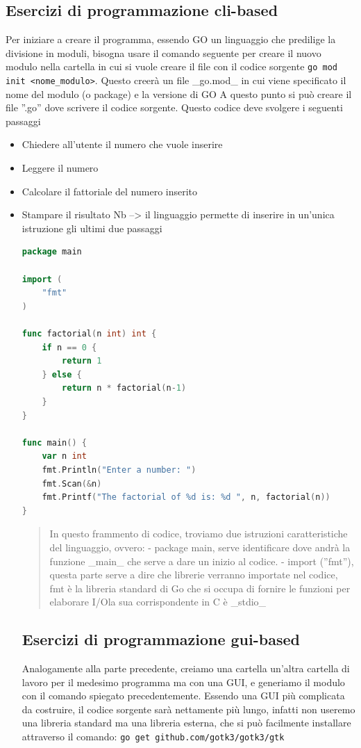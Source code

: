 \newpage

\subsection{Esercizi di programmazione cli-based}
Per iniziare a creare il programma, essendo GO un linguaggio che predilige la divisione in moduli, bisogna usare il comando seguente per creare il nuovo modulo nella cartella in cui si vuole creare il file con il codice sorgente \texttt{go mod init <nome\_modulo>}.\newline 
Questo creerà un file _go.mod_ in cui viene specificato il nome del modulo (o package) e la versione di GO\@
A questo punto si può creare il file ''.go'' dove scrivere il codice sorgente.
Questo codice deve svolgere i seguenti passaggi
\begin{itemize}
\item Chiedere all'utente il numero che vuole inserire
\item Leggere il numero
\item Calcolare il fattoriale del numero inserito
\item Stampare il risultato
Nb --> il linguaggio permette di inserire in un'unica istruzione gli ultimi due passaggi
\begin{lstlisting}[language=Go]
package main

import (
	"fmt"
)

func factorial(n int) int {
	if n == 0 {
		return 1
	} else {
		return n * factorial(n-1)
	}
}

func main() {
	var n int
	fmt.Println("Enter a number: ")
	fmt.Scan(&n)
	fmt.Printf("The factorial of %d is: %d ", n, factorial(n))
}
\end{lstlisting}
\begin{quote}
In questo frammento di codice, troviamo due istruzioni caratteristiche del linguaggio, ovvero:
- package main, serve identificare dove andrà la funzione _main_ che serve a dare un inizio al codice.
- import (''fmt''), questa parte serve a dire che librerie verranno importate nel codice, fmt è la libreria standard di Go che si occupa di fornire le funzioni per elaborare I/O\@ la sua corrispondente in C è _stdio_

\end{quote}
\newpage
\subsection{Esercizi di programmazione gui-based}
Analogamente alla parte precedente, creiamo una cartella un'altra cartella di lavoro per il medesimo programma ma con una GUI, e generiamo il modulo con il comando spiegato precedentemente. Essendo una GUI più complicata da costruire, il codice sorgente sarà nettamente più lungo, infatti non useremo una libreria standard ma una libreria esterna, che si può facilmente installare attraverso il comando:
\texttt{go get github.com/gotk3/gotk3/gtk} \newline


\end{itemize}
